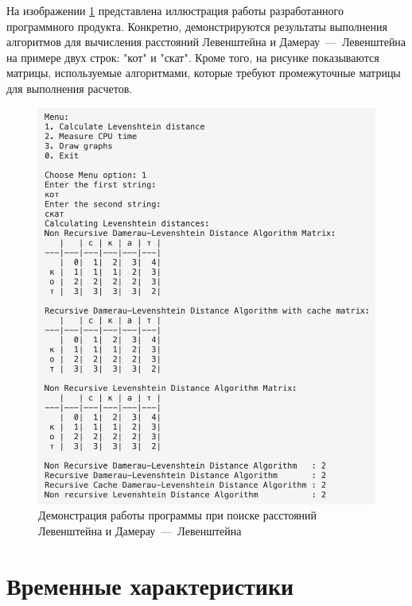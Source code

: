 На изображении \ref{img:demonstration} представлена иллюстрация работы разработанного программного продукта. 
Конкретно, демонстрируются результаты выполнения алгоритмов для вычисления расстояний Левенштейна и Дамерау~---~Левенштейна на примере двух строк: "кот" и "скат". 
Кроме того, на рисунке показываются матрицы, используемые алгоритмами, которые требуют промежуточные матрицы для выполнения расчетов.\clearpage
\begin{figure}[h]
	\centering
	\includegraphics[height=0.7\textheight]{img/example.png}
	\caption{Демонстрация работы программы при поиске расстояний Левенштейна и Дамерау~---~Левенштейна}
	\label{img:demonstration}
\end{figure}

\clearpage

\section{Временные характеристики}

